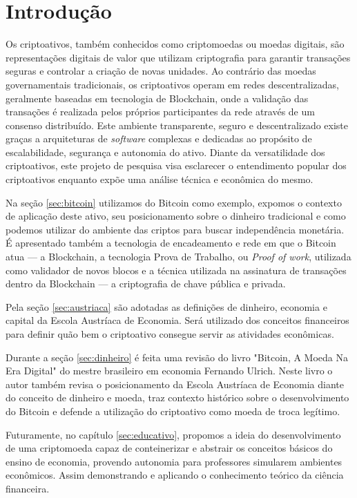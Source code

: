 
\chapter{Introdução}

Os criptoativos, também conhecidos como criptomoedas ou moedas digitais, são representações digitais de valor que utilizam criptografia para garantir transações seguras e controlar a criação de novas unidades. Ao contrário das moedas governamentais tradicionais, os criptoativos operam em redes descentralizadas, geralmente baseadas em tecnologia de Blockchain, onde a validação das transações é realizada pelos próprios participantes da rede através de um consenso distribuído. Este ambiente transparente, seguro e descentralizado existe graças a arquiteturas de \textit{software} complexas e dedicadas ao propósito de escalabilidade, segurança e autonomia do ativo. Diante da versatilidade dos criptoativos, este projeto de pesquisa visa esclarecer o entendimento popular dos criptoativos enquanto expõe uma análise técnica e econômica do mesmo. 

Na seção \ref*{sec:bitcoin} utilizamos do Bitcoin como exemplo, expomos o contexto de aplicação deste ativo, seu posicionamento sobre o dinheiro tradicional e como podemos utilizar do ambiente das criptos para buscar independência monetária. É apresentado também a tecnologia de encadeamento e rede em que o Bitcoin atua — a Blockchain, a tecnologia Prova de Trabalho, ou \textit{Proof of work}, utilizada como validador de novos blocos e a técnica utilizada na assinatura de transações dentro da Blockchain — a criptografia de chave pública e privada.

Pela seção \ref*{sec:austriaca} são adotadas as definições de dinheiro, economia e capital da Escola Austríaca de Economia. Será utilizado dos conceitos financeiros para definir quão bem o criptoativo consegue servir as atividades econômicas.

Durante a seção \ref*{sec:dinheiro} é feita uma revisão do livro "Bitcoin, A Moeda Na Era Digital" do mestre brasileiro em economia Fernando Ulrich. Neste livro o autor também revisa o posicionamento da Escola Austríaca de Economia diante do conceito de dinheiro e moeda, traz contexto histórico sobre o desenvolvimento do Bitcoin e defende a utilização do criptoativo como moeda de troca legítimo.

Futuramente, no capítulo \ref*{sec:educativo}, propomos a ideia do desenvolvimento de uma criptomoeda capaz de conteinerizar e abstrair os conceitos básicos do ensino de economia, provendo autonomia para professores simularem ambientes econômicos. Assim demonstrando e aplicando o conhecimento teórico da ciência financeira.

